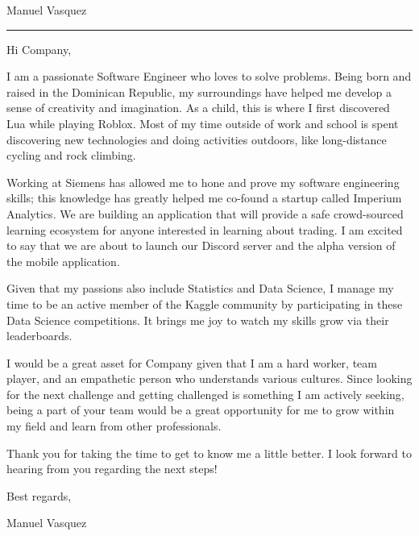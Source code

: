 \documentclass{article}
\newcommand{\position}{I am writing to apply for the \_ position.}
\newcommand{\company}{Company}
\newcommand{\name}{Manuel Vasquez}
\begin{document}
\begin{minipage}[t]{.69\linewidth}
    \begin{center}
        \Huge \name
    \end{center}
    \vspace*{1.89cm}
    \hrule
    \vspace*{.49cm}

    \raggedright

    Hi \company,
    \vspace*{.49cm}


    
    I am a passionate Software Engineer who loves to solve problems. Being born and raised in the Dominican Republic, my surroundings have helped me develop a sense of creativity and imagination. As a child, this is where I first discovered Lua while playing Roblox. Most of my time outside of work and school is spent discovering new technologies and doing activities outdoors, like long-distance cycling and rock climbing.
    \vspace*{.49cm}

    Working at Siemens has allowed me to hone and prove my software engineering skills; this knowledge has greatly helped me co-found a startup called Imperium Analytics. We are building an application that will provide a safe crowd-sourced learning ecosystem for anyone interested in learning about trading. I am excited to say that we are about to launch our Discord server and the alpha version of the mobile application.
    \vspace*{.49cm}

    Given that my passions also include Statistics and Data Science, I manage my time to be an active member of the Kaggle community by participating in these Data Science competitions. It brings me joy to watch my skills grow via their leaderboards.
    \vspace*{.49cm}
    
    I would be a great asset for \company $ $ given that I am a hard worker, team player, and an empathetic person who understands various cultures. Since looking for the next challenge and getting challenged is something I am actively seeking, being a part of your team would be a great opportunity for me to grow within my field and learn from other professionals.
    \vspace*{.49cm}

    Thank you for taking the time to get to know me a little better. I look forward to hearing from you regarding the next steps!
    \vspace*{1cm}

    Best regards,
    \vspace*{.49cm}

    \name
\end{minipage}
\end{document}
